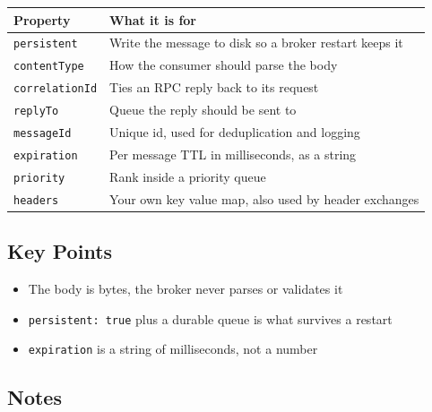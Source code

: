 \documentclass[11pt,a4paper]{article}
\begin{document}

\begin{table}[h]
\centering
\begin{tabularx}{\textwidth}{@{}lX@{}}
\toprule
\rowcolor{tablehead}
\textbf{\color{accent}Property} & \textbf{\color{accent}What it is for} \\
\midrule
\lstinline|persistent|     & Write the message to disk so a broker restart keeps it \\
\lstinline|contentType|    & How the consumer should parse the body \\
\lstinline|correlationId|  & Ties an RPC reply back to its request \\
\lstinline|replyTo|        & Queue the reply should be sent to \\
\lstinline|messageId|      & Unique id, used for deduplication and logging \\
\lstinline|expiration|     & Per message TTL in milliseconds, as a string \\
\lstinline|priority|       & Rank inside a priority queue \\
\lstinline|headers|        & Your own key value map, also used by header exchanges \\
\bottomrule
\end{tabularx}
\end{table}

\subsection*{Key Points}

\begin{itemize}\itemsep2pt
  \item The body is bytes, the broker never parses or validates it
  \item \lstinline|persistent: true| plus a durable queue is what survives a restart
  \item \lstinline|expiration| is a string of milliseconds, not a number
\end{itemize}

\subsection*{Notes}
\end{document}
